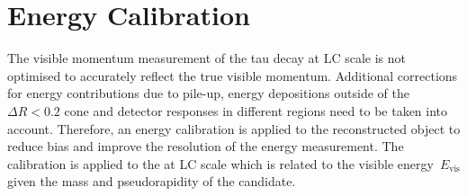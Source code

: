 %
%
%
%
%

\section{Energy Calibration}
\label{sec:reco_energy_calib}
%
%
%
The visible momentum measurement of the tau decay at LC scale is not optimised
to accurately reflect the true visible momentum. Additional corrections for
energy contributions due to pile-up, energy depositions outside of the
$\Delta R < 0.2$ cone and detector responses in different regions need to be
taken into account. Therefore, an energy calibration is applied to the
reconstructed object to reduce bias and improve the resolution of the energy
measurement. The calibration is applied to the \tauhadvis \pt at LC scale which
is related to the visible energy~$E_\text{vis}$ given the mass and
pseudorapidity of the \tauhadvis candidate.

